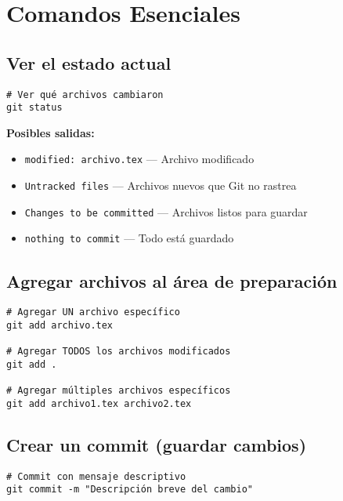 \documentclass[12pt,a4paper]{article}
\begin{document}
\section{Comandos Esenciales}

\subsection{Ver el estado actual}

\begin{lstlisting}[style=bashstyle]
# Ver qué archivos cambiaron
git status
\end{lstlisting}

\textbf{Posibles salidas:}
\begin{itemize}
  \item \texttt{modified: archivo.tex} --- Archivo modificado
  \item \texttt{Untracked files} --- Archivos nuevos que Git no rastrea
  \item \texttt{Changes to be committed} --- Archivos listos para guardar
  \item \texttt{nothing to commit} --- Todo está guardado
\end{itemize}

\subsection{Agregar archivos al área de preparación}

\begin{lstlisting}[style=bashstyle]
# Agregar UN archivo específico
git add archivo.tex

# Agregar TODOS los archivos modificados
git add .

# Agregar múltiples archivos específicos
git add archivo1.tex archivo2.tex
\end{lstlisting}

\subsection{Crear un commit (guardar cambios)}

\begin{lstlisting}[style=bashstyle]
# Commit con mensaje descriptivo
git commit -m "Descripción breve del cambio"
\end{lstlisting}
\end{document}

